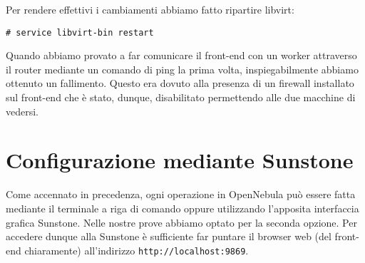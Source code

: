 \documentclass[twoside]{article}
\begin{document}
Per rendere effettivi i cambiamenti abbiamo fatto ripartire libvirt:
\begin{lstlisting}[frame=trBL]
# service libvirt-bin restart
\end{lstlisting}

Quando abbiamo provato a far comunicare il front-end con un worker attraverso il router
mediante un comando di ping la prima volta, inspiegabilmente abbiamo ottenuto un fallimento. Questo
era dovuto alla presenza di un firewall installato sul front-end che è stato, dunque, disabilitato
permettendo alle due macchine di vedersi.

\section{Configurazione mediante Sunstone}
Come accennato in precedenza, ogni operazione in OpenNebula può essere fatta mediante
il terminale a riga di comando oppure utilizzando l'apposita interfaccia grafica Sunstone. Nelle nostre
prove abbiamo optato per la seconda opzione. Per accedere dunque alla Sunstone è sufficiente far puntare il
browser web (del front-end chiaramente) all'indirizzo \texttt{http://localhost:9869}.
\end{document}
